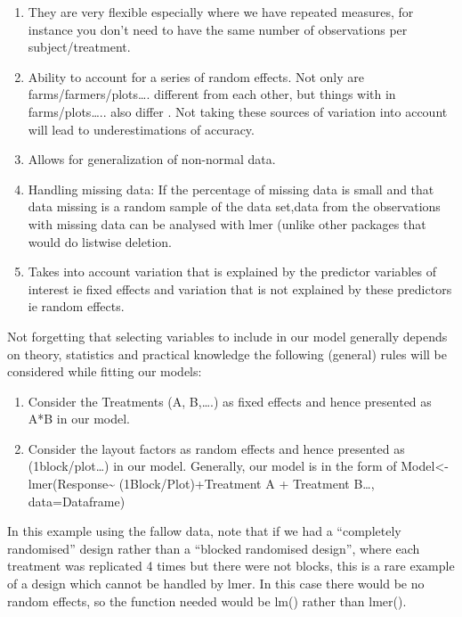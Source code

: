 \documentclass[]{book}
\providecommand{\tightlist}{%
  \setlength{\itemsep}{0pt}\setlength{\parskip}{0pt}}
\theoremstyle{definition}
\theoremstyle{definition}
\theoremstyle{definition}
\theoremstyle{remark}
\begin{document}
\begin{enumerate}
\def\labelenumi{\arabic{enumi}.}
\tightlist
\item
  They are very flexible especially where we have repeated measures, for
  instance you don't need to have the same number of observations per
  subject/treatment.
\item
  Ability to account for a series of random effects. Not only are
  farms/farmers/plots\ldots{}. different from each other, but things
  with in farms/plots\ldots{}.. also differ . Not taking these sources
  of variation into account will lead to underestimations of accuracy.
\item
  Allows for generalization of non-normal data.\\
\item
  Handling missing data: If the percentage of missing data is small and
  that data missing is a random sample of the data set,data from the
  observations with missing data can be analysed with lmer (unlike other
  packages that would do listwise deletion.
\item
  Takes into account variation that is explained by the predictor
  variables of interest ie fixed effects and variation that is not
  explained by these predictors ie random effects.
\end{enumerate}

Not forgetting that selecting variables to include in our model
generally depends on theory, statistics and practical knowledge the
following (general) rules will be considered while fitting our models:

\begin{enumerate}
\def\labelenumi{\roman{enumi})}
\tightlist
\item
  Consider the Treatments (A, B,\ldots{}.) as fixed effects and hence
  presented as A*B in our model.
\item
  Consider the layout factors as random effects and hence presented as
  (1\textbar{}block/plot\ldots{}) in our model. Generally, our model is
  in the form of Model\textless{}-lmer(Response\textasciitilde{}
  (1\textbar{}Block/Plot)+Treatment A + Treatment B\ldots{},
  data=Dataframe)
\end{enumerate}

In this example using the fallow data, note that if we had a
``completely randomised'' design rather than a ``blocked randomised
design'', where each treatment was replicated 4 times but there were not
blocks, this is a rare example of a design which cannot be handled by
lmer. In this case there would be no random effects, so the function
needed would be lm() rather than lmer().
\end{document}
